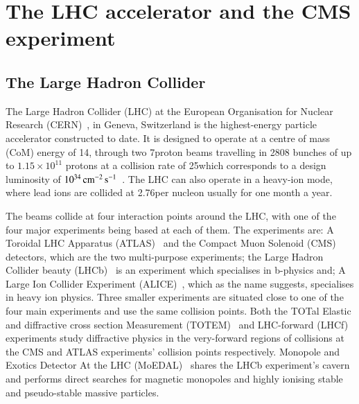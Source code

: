 \section{The LHC accelerator and the CMS experiment}\label{sec:lhc-cms}
\subsection{The Large Hadron Collider}\label{subsec:lhc}

The Large Hadron Collider (LHC) at the European Organisation for Nuclear Research (CERN)~\cite{Bruning:782076}, in Geneva, Switzerland is the highest-energy particle accelerator constructed to date. 
It is designed to operate at a centre of mass (CoM) energy of 14\TeV, through two 7\TeV proton beams travelling in 2808 bunches of up to $1.15 \times 10^{11}$ protons at a collision rate of 25\ns which corresponds to a design luminosity of $10^{34}\,\text{cm}^\text{$-$2}\,\text{s}^\text{$-$1}$~\cite{Bayatian:2006zz}. 
The LHC can also operate in a heavy-ion mode, where lead ions are collided at 2.76\TeV per nucleon usually for one month a year.

The beams collide at four interaction points around the LHC, with one of the four major experiments being based at each of them. 
The experiments are: A Toroidal LHC Apparatus (ATLAS)~\cite{Aad:2008zzm} and the Compact Muon Solenoid (CMS)~\cite{oldcms} detectors, which are the two multi-purpose experiments; the Large Hadron Collider beauty (LHCb)~\cite{Alves:2008zz} is an experiment which specialises in b-physics and; A Large Ion Collider Experiment (ALICE)~\cite{Aamodt:2008zz}, which as the name suggests, specialises in heavy ion physics.
Three smaller experiments are situated close to one of the four main experiments and use the same collision points.
Both the TOTal Elastic and diffractive cross section Measurement (TOTEM)~\cite{Anelli:2008zza} and LHC-forward (LHCf)~\cite{Adriani:2008zz} experiments study diffractive physics in the very-forward regions of collisions at the CMS and ATLAS experiments' collision points respectively.
Monopole and Exotics Detector At the LHC (MoEDAL)~\cite{Pinfold:2009oia} shares the LHCb experiment's cavern and performs direct searches for magnetic monopoles and highly ionising stable and pseudo-stable massive particles.

